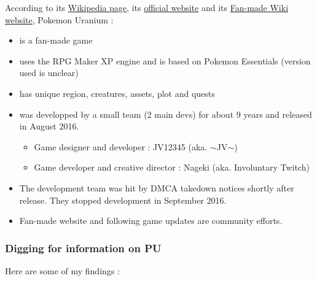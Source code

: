 \documentclass[11pt]{article}
\begin{document}
According to its \href{https://en.wikipedia.org/wiki/Pok\%C3\%A9mon_Uranium}{Wikipedia page}, its \href{http://pokemonuranium.org/}{official website} and its \href{https://pokemon-uranium.fandom.com/wiki/Main_Page}{Fan-made Wiki website}, Pokemon Uranium :
\begin{itemize}
	\item is a fan-made game
	\item uses the RPG Maker XP engine and is based on Pokemon Essentials (version used is unclear)
	\item has unique region, creatures, assets, plot and quests
	\item was developped by a small team (2 main devs) for about 9 years and released in August 2016.
	\begin{itemize}
		\item Game designer and developer : JV12345 (aka. $\sim$JV$\sim$)
		\item Game developer and creative director : Nageki (aka. Involuntary Twitch)
	\end{itemize}
	\item The development team was hit by DMCA takedown notices shortly after release. They stopped development in September 2016.
	\item Fan-made website and following game updates are community efforts.
\end{itemize}

\subsubsection{Digging for information on PU}

Here are some of my findings :
\end{document}
